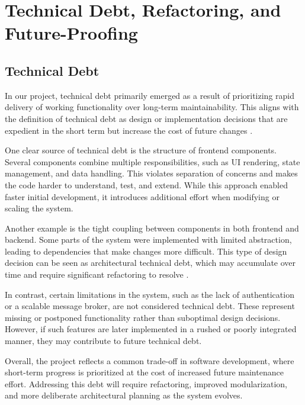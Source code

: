\section{Technical Debt, Refactoring, and Future-Proofing}

\subsection{Technical Debt}

In our project, technical debt primarily emerged as a result of prioritizing rapid
delivery of working functionality over long-term maintainability.
This aligns with the definition of technical debt as design or implementation
decisions that are expedient in the short term but increase the cost of future changes \cite{TechnicalDebtTheoryAndPractice}.

One clear source of technical debt is the structure of frontend components.
Several components combine multiple responsibilities, such as UI rendering,
state management, and data handling.
This violates separation of concerns and makes the code harder to understand,
test, and extend.
While this approach enabled faster initial development,
it introduces additional effort when modifying or scaling the system.

Another example is the tight coupling between components in both frontend and backend.
Some parts of the system were implemented with limited abstraction,
leading to dependencies that make changes more difficult.
This type of design decision can be seen as architectural technical debt,
which may accumulate over time and require significant refactoring to resolve
\cite{InvestigatingArchtiecturalTechnicalDebt}.

In contrast, certain limitations in the system, such as the lack of
authentication or a scalable message broker, are not considered technical debt.
These represent missing or postponed functionality rather than suboptimal
design decisions.
However, if such features are later implemented in a rushed or poorly
integrated manner, they may contribute to future technical debt.

Overall, the project reflects a common trade-off in software development,
where short-term progress is prioritized at the cost of increased future
maintenance effort.
Addressing this debt will require refactoring, improved modularization,
and more deliberate architectural planning as the system evolves.

